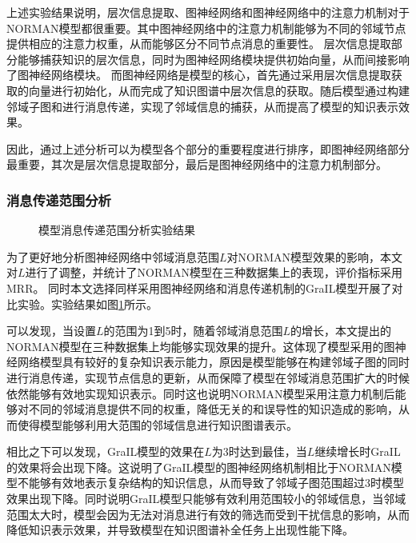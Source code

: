 \documentclass[algorithmlist, AutoFakeBold, AutoFakeSlant, figurelist, tablelist, nomlist, engineering, openany]{seuthesix} %
\begin{document}
上述实验结果说明，层次信息提取、图神经网络和图神经网络中的注意力机制对于NORMAN模型都很重要。其中图神经网络中的注意力机制能够为不同的邻域节点提供相应的注意力权重，从而能够区分不同节点消息的重要性。
层次信息提取部分能够捕获知识的层次信息，同时为图神经网络模块提供初始向量，从而间接影响了图神经网络模块。
而图神经网络是模型的核心，首先通过采用层次信息提取获取的向量进行初始化，从而完成了知识图谱中层次信息的获取。随后模型通过构建邻域子图和进行消息传递，实现了邻域信息的捕获，从而提高了模型的知识表示效果。

因此，通过上述分析可以为模型各个部分的重要程度进行排序，即图神经网络部分最重要，其次是层次信息提取部分，最后是图神经网络中的注意力机制部分。

\subsubsection{消息传递范围分析}
\begin{figure}[t]
  \centering
  \caption{模型消息传递范围分析实验结果}
  \label{Experiment1_messageRange}
\end{figure}

为了更好地分析图神经网络中邻域消息范围$L$对NORMAN模型效果的影响，本文对$L$进行了调整，并统计了NORMAN模型在三种数据集上的表现，评价指标采用MRR。
同时本文选择同样采用图神经网络和消息传递机制的GraIL模型开展了对比实验。实验结果如图\ref{Experiment1_messageRange}所示。

可以发现，当设置$L$的范围为1到5时，随着邻域消息范围$L$的增长，本文提出的NORMAN模型在三种数据集上均能够实现效果的提升。这体现了模型采用的图神经网络模型具有较好的复杂知识表示能力，原因是模型能够在构建邻域子图的同时进行消息传递，实现节点信息的更新，从而保障了模型在邻域消息范围扩大的时候依然能够有效地实现知识表示。同时这也说明NORMAN模型采用注意力机制后能够对不同的邻域消息提供不同的权重，降低无关的和误导性的知识造成的影响，从而使得模型能够利用大范围的邻域信息进行知识图谱表示。

相比之下可以发现，GraIL模型的效果在$L$为3时达到最佳，当$L$继续增长时GraIL的效果将会出现下降。这说明了GraIL模型的图神经网络机制相比于NORMAN模型不能够有效地表示复杂结构的知识信息，从而导致了邻域子图范围超过3时模型效果出现下降。同时说明GraIL模型只能够有效利用范围较小的邻域信息，当邻域范围太大时，模型会因为无法对消息进行有效的筛选而受到干扰信息的影响，从而降低知识表示效果，并导致模型在知识图谱补全任务上出现性能下降。
\end{document}
